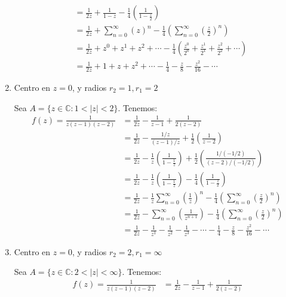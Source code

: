\begin{problema}
\begin{enumerate}
\begin{sol}
\begin{align*}
                &= \frac{1}{2z}+\frac{1}{1-z}-\frac{1}{4}\left(\frac{1}{1-\frac{z}{2}}\right)\\
                &= \frac{1}{2z}+\sum_{n=0}^{\infty}\left(z\right)^n-\frac{1}{4}\left(\sum_{n=0}^{\infty}\left(\frac{z}{2}\right)^n\right)\\
                &= \frac{1}{2z}+z^0+z^1+z^2+\cdots -\frac{1}{4}\left(\frac{z^0}{2^0}+\frac{z^1}{2^1}+\frac{z^2}{2^2}+\cdots\right)\\
                &= \frac{1}{2z}+1+z+z^2+\cdots -\frac{1}{4}-\frac{z}{8}-\frac{z^2}{16}-\cdots
            \end{align*}
        \end{sol}
        \item Centro en $z=0$, y radios $r_2=1, r_1=2$
        \begin{sol}
            Sea $A=\{z\in\mathbb{C}: 1<|z|<2\}$. Tenemos: 
            \begin{align*}
                f(z)=\frac{1}{z(z-1)(z-2)} &= \frac{1}{2z}-\frac{1}{z-1}+\frac{1}{2(z-2)}\\
                &= \frac{1}{2z}-\frac{1\big/ z}{(z-1)\big/ z}+\frac{1}{2}\left(\frac{1}{z-2}\right)\\
                &= \frac{1}{2z}-\frac{1}{z}\left(\frac{1}{1-\frac{1}{z}}\right)+\frac{1}{2}\left(\frac{1\big/(-1/2)}{(z-2)\big/ (-1/2)}\right)\\
                &= \frac{1}{2z}-\frac{1}{z}\left(\frac{1}{1-\frac{1}{z}}\right)-\frac{1}{4}\left(\frac{1}{1-\frac{z}{2}}\right)\\
                &= \frac{1}{2z}-\frac{1}{z}\sum_{n=0}^{\infty}\left(\frac{1}{z}\right)^n-\frac{1}{4}\left(\sum_{n=0}^{\infty}\left(\frac{z}{2}\right)^n\right)\\
                &= \frac{1}{2z}-\sum_{n=0}^{\infty}\left(\frac{1}{z^{n+1}}\right)-\frac{1}{4}\left(\sum_{n=0}^{\infty}\left(\frac{z}{2}\right)^n\right)\\
                &= \frac{1}{2z}-\frac{1}{z^1}-\frac{1}{z^2}-\frac{1}{z^3}-\cdots - \frac{1}{4}-\frac{z}{8}-\frac{z^2}{16}-\cdots
            \end{align*}
        \end{sol}
        \item Centro en $z=0$, y radios $r_2=2, r_1=\infty$
        \begin{sol}
            Sea $A=\{z\in\mathbb{C}: 2<|z|<\infty\}$. Tenemos: 
            \begin{align*}
                f(z)=\frac{1}{z(z-1)(z-2)} &= \frac{1}{2z}-\frac{1}{z-1}+\frac{1}{2(z-2)}\\

\end{align*}
\end{sol}
\end{enumerate}
\end{problema}
